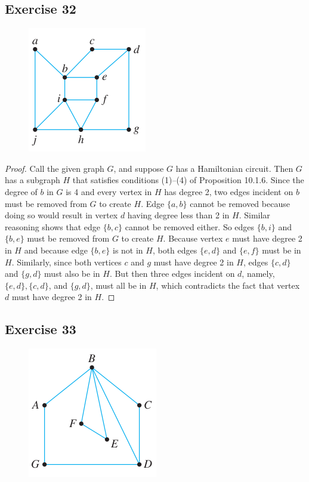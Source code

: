 \documentclass[14pt]{extarticle}
\begin{document}
\subsection{Exercise 32}
\begin{figure}[ht!]
\centering
\includegraphics[scale=0.5]{../images/10.1.32.png}
\end{figure}

\begin{proof}
Call the given graph \(G\), and suppose \(G\) has a Hamiltonian circuit. Then \(G\) has a subgraph \(H\) that 
satisfies conditions (1)–(4) of Proposition 10.1.6. Since the degree of \(b\) in \(G\) is 4 and every vertex in \(H\) has 
degree 2, two edges incident on \(b\) must be removed from \(G\) to create \(H\). Edge \(\{a, b\}\) cannot be removed 
because doing so would result in vertex \(d\) having degree less than 2 in \(H\). Similar reasoning shows that edge 
\(\{b, c\}\) cannot be removed either. So edges \(\{b, i\}\) and \(\{b, e\}\) must be removed from \(G\) to create \(H\). 
Because vertex \(e\) must have degree 2 in \(H\) and because edge \(\{b, e\}\) is not in \(H\), both edges \(\{e, d\}\) and 
\(\{e, f\}\) must be in \(H\). Similarly, since both vertices \(c\) and \(g\) must have degree 2 in \(H\), edges \(\{c,d\}\) 
and \(\{g, d\}\) must also be in \(H\). But then three edges incident on \(d\), namely, \(\{e, d\}, \{c, d\}\), and 
\(\{g, d\}\), must all be in \(H\), which contradicts the fact that vertex \(d\) must have degree 2 in \(H\).
\end{proof}

\subsection{Exercise 33}
\begin{figure}[ht!]
\centering
\includegraphics[scale=0.4]{../images/10.1.33.png}
\end{figure}
\end{document}
